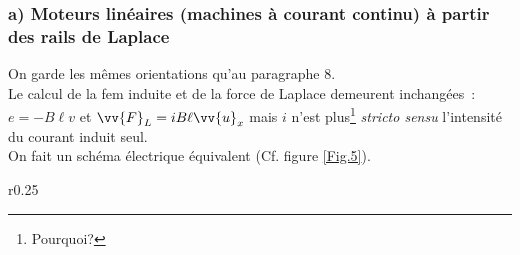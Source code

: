 \documentclass{article}
\renewcommand\overrightarrow{\vv}
\begin{document}
\subsubsection*{a) Moteurs linéaires (machines à courant continu) à partir des rails de Laplace}
On garde les mêmes
orientations qu'au paragraphe 8. \\
Le calcul de la fem induite et de la force de Laplace demeurent
inchangées : $e = -B\ell v$ et $\overrightarrow{F}_{L} = iB\ell
\overrightarrow{u}_{x}$ mais $i$ n'est plus\footnote{Pourquoi?} \textit{stricto sensu} l'intensité du courant induit seul. \\
On fait un schéma électrique équivalent (Cf. figure \ref{Fig.5}).



\begin{wrapfigure}{r}{0.25\textwidth}
\caption{}\label{Fig.5}
\end{wrapfigure}
\end{document}
